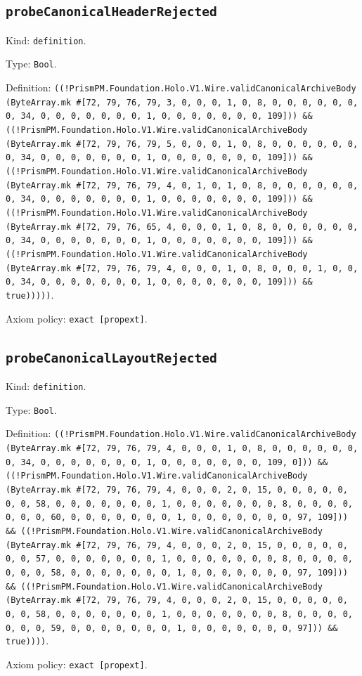 \documentclass[11pt]{article}
\begin{document}
\subsection*{\texttt{probeCanonicalHeaderRejected}}
\noindent Kind: \texttt{definition}.\par
\noindent Type: \texttt{Bool}.\par
\noindent Definition: \texttt{((!PrismPM.Foundation.Holo.V1.Wire.validCanonicalArchiveBody (ByteArray.mk \#[72, 79, 76, 79, 3, 0, 0, 0, 1, 0, 8, 0, 0, 0, 0, 0, 0, 0, 34, 0, 0, 0, 0, 0, 0, 0, 1, 0, 0, 0, 0, 0, 0, 0, 109])) \&\& ((!PrismPM.Foundation.Holo.V1.Wire.validCanonicalArchiveBody (ByteArray.mk \#[72, 79, 76, 79, 5, 0, 0, 0, 1, 0, 8, 0, 0, 0, 0, 0, 0, 0, 34, 0, 0, 0, 0, 0, 0, 0, 1, 0, 0, 0, 0, 0, 0, 0, 109])) \&\& ((!PrismPM.Foundation.Holo.V1.Wire.validCanonicalArchiveBody (ByteArray.mk \#[72, 79, 76, 79, 4, 0, 1, 0, 1, 0, 8, 0, 0, 0, 0, 0, 0, 0, 34, 0, 0, 0, 0, 0, 0, 0, 1, 0, 0, 0, 0, 0, 0, 0, 109])) \&\& ((!PrismPM.Foundation.Holo.V1.Wire.validCanonicalArchiveBody (ByteArray.mk \#[72, 79, 76, 65, 4, 0, 0, 0, 1, 0, 8, 0, 0, 0, 0, 0, 0, 0, 34, 0, 0, 0, 0, 0, 0, 0, 1, 0, 0, 0, 0, 0, 0, 0, 109])) \&\& ((!PrismPM.Foundation.Holo.V1.Wire.validCanonicalArchiveBody (ByteArray.mk \#[72, 79, 76, 79, 4, 0, 0, 0, 1, 0, 8, 0, 0, 0, 1, 0, 0, 0, 34, 0, 0, 0, 0, 0, 0, 0, 1, 0, 0, 0, 0, 0, 0, 0, 109])) \&\& true)))))}.\par
\noindent Axiom policy: \texttt{exact [propext]}.\par
\subsection*{\texttt{probeCanonicalLayoutRejected}}
\noindent Kind: \texttt{definition}.\par
\noindent Type: \texttt{Bool}.\par
\noindent Definition: \texttt{((!PrismPM.Foundation.Holo.V1.Wire.validCanonicalArchiveBody (ByteArray.mk \#[72, 79, 76, 79, 4, 0, 0, 0, 1, 0, 8, 0, 0, 0, 0, 0, 0, 0, 34, 0, 0, 0, 0, 0, 0, 0, 1, 0, 0, 0, 0, 0, 0, 0, 109, 0])) \&\& ((!PrismPM.Foundation.Holo.V1.Wire.validCanonicalArchiveBody (ByteArray.mk \#[72, 79, 76, 79, 4, 0, 0, 0, 2, 0, 15, 0, 0, 0, 0, 0, 0, 0, 58, 0, 0, 0, 0, 0, 0, 0, 1, 0, 0, 0, 0, 0, 0, 0, 8, 0, 0, 0, 0, 0, 0, 0, 60, 0, 0, 0, 0, 0, 0, 0, 1, 0, 0, 0, 0, 0, 0, 0, 97, 109])) \&\& ((!PrismPM.Foundation.Holo.V1.Wire.validCanonicalArchiveBody (ByteArray.mk \#[72, 79, 76, 79, 4, 0, 0, 0, 2, 0, 15, 0, 0, 0, 0, 0, 0, 0, 57, 0, 0, 0, 0, 0, 0, 0, 1, 0, 0, 0, 0, 0, 0, 0, 8, 0, 0, 0, 0, 0, 0, 0, 58, 0, 0, 0, 0, 0, 0, 0, 1, 0, 0, 0, 0, 0, 0, 0, 97, 109])) \&\& ((!PrismPM.Foundation.Holo.V1.Wire.validCanonicalArchiveBody (ByteArray.mk \#[72, 79, 76, 79, 4, 0, 0, 0, 2, 0, 15, 0, 0, 0, 0, 0, 0, 0, 58, 0, 0, 0, 0, 0, 0, 0, 1, 0, 0, 0, 0, 0, 0, 0, 8, 0, 0, 0, 0, 0, 0, 0, 59, 0, 0, 0, 0, 0, 0, 0, 1, 0, 0, 0, 0, 0, 0, 0, 97])) \&\& true))))}.\par
\noindent Axiom policy: \texttt{exact [propext]}.\par
\end{document}
